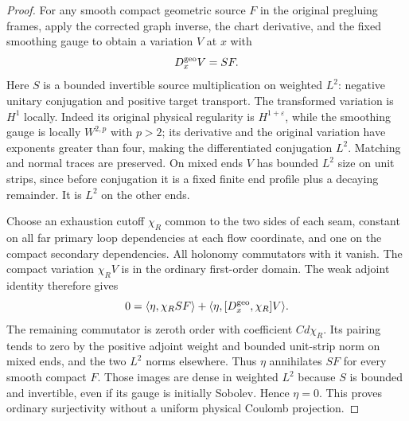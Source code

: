 \documentclass[11pt]{amsart}
\theoremstyle{definition}
\theoremstyle{remark}
\theoremstyle{plain}
\begin{document}
\begin{proof}
For any smooth compact geometric source $F$ in the original
pregluing frames, apply the corrected graph inverse, the chart
derivative, and the fixed smoothing gauge to obtain a variation $V$
at $x$ with
\[
                         D_x^{\rm geo}V=SF.
\]
Here $S$ is a bounded invertible source multiplication on weighted
$L^2$: negative unitary conjugation and positive target transport.
The transformed variation is $H^1$ locally. Indeed its original
physical regularity is $H^{1+\varepsilon}$, while the smoothing
gauge is locally $W^{2,p}$ with $p>2$; its derivative and the
original variation have exponents greater than four, making the
differentiated conjugation $L^2$. Matching and normal traces are
preserved. On mixed ends $V$ has bounded $L^2$ size on unit
strips, since before conjugation it is a fixed finite end profile
plus a decaying remainder. It is $L^2$ on the other ends.

Choose an exhaustion cutoff $\chi_R$ common to the two sides of
each seam, constant on all far primary loop dependencies at each
flow coordinate, and one on the compact secondary dependencies.
All holonomy commutators with it vanish. The compact variation
$\chi_RV$ is in the ordinary first-order domain. The weak adjoint
identity therefore gives
\[
 0=\langle\eta,\chi_RSF\rangle
                         +\langle\eta,[D_x^{\rm geo},\chi_R]V\rangle.
\]
The remaining commutator is zeroth order with coefficient $Cd\chi_R$.
Its pairing tends to zero by the positive adjoint weight and bounded
unit-strip norm on mixed ends, and the two $L^2$ norms elsewhere.
Thus $\eta$ annihilates $SF$ for every smooth compact $F$.
Those images are dense in weighted $L^2$ because $S$ is bounded
and invertible, even if its gauge is initially Sobolev. Hence
$\eta=0$. This proves ordinary surjectivity without a uniform
physical Coulomb projection.


\end{proof}
\end{document}
